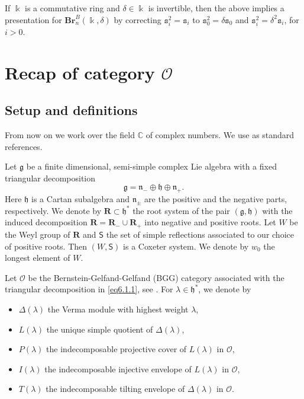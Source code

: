 \documentclass[a4paper]{amsart}
\begin{document}
If $\Bbbk$ is a commutative ring and $\delta\in\Bbbk$ is invertible, then
the above implies a presentation for $\mathbf{Br}_n^B(\Bbbk,\delta)$ by
correcting $\mathtt{s}_i^2=\mathtt{s}_i$ to $\mathtt{s}_0^2=\delta\mathtt{s}_0$
and $\mathtt{s}_i^2=\delta^2\mathtt{s}_i$, for $i>0$.


\section{Recap of category $\mathcal{O}$}\label{s5}

\subsection{Setup and definitions}\label{s5.1}

From now on we work over the field $\mathbb{C}$ of complex numbers.
We use \cite{Hu1,Hu2} as standard references.

Let $\mathfrak{g}$ be a finite dimensional, semi-simple complex Lie algebra
with a fixed triangular decomposition
\begin{equation}\label{eq6.1.1}
\mathfrak{g}=\mathfrak{n}_-\oplus \mathfrak{h}\oplus \mathfrak{n}_+. 
\end{equation}
Here $\mathfrak{h}$ is a Cartan subalgebra and $\mathfrak{n}_{\pm}$ are the positive
and the negative parts, respectively. We denote by $\mathbf{R}\subset \mathfrak{h}^*$ 
the root system of the pair $(\mathfrak{g},\mathfrak{h})$ with the induced 
decomposition $\mathbf{R}=\mathbf{R}_-\cup \mathbf{R}_+$ into negative and positive roots.
Let $W$ be the Weyl group of $\mathbf{R}$ and $\mathsf{S}$ the set of simple reflections
associated to our choice of positive roots. Then $(W,\mathsf{S})$ is a Coxeter system.
We denote by $w_0$ the longest element of $W$.

Let $\mathcal{O}$ be the Bernstein-Gelfand-Gelfand (BGG) category associated with the
triangular decomposition in \eqref{eq6.1.1}, see \cite{BGG1,BGG2}. For $\lambda\in\mathfrak{h}^*$,
we denote by
\begin{itemize}
\item $\Delta(\lambda)$ the Verma module with highest weight $\lambda$,
\item $L(\lambda)$ the unique simple quotient  of $\Delta(\lambda)$,
\item $P(\lambda)$ the indecomposable projective cover of  $L(\lambda)$ in $\mathcal{O}$,
\item $I(\lambda)$ the indecomposable injective envelope of  $L(\lambda)$ in $\mathcal{O}$,
\item $T(\lambda)$ the indecomposable tilting envelope of  $\Delta(\lambda)$ in $\mathcal{O}$.
\end{itemize}
\end{document}
